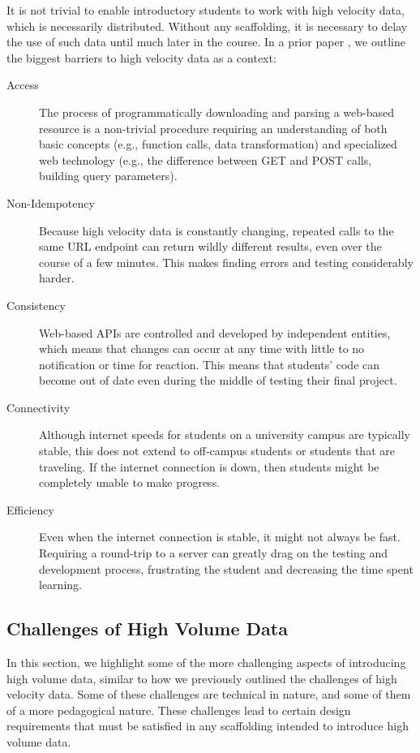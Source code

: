 It is not trivial to enable introductory students to work with high velocity data, which is necessarily distributed. Without any scaffolding, it is necessary to delay the use of such data until much later in the course. In a prior paper \cite{realtimeweb-splashe}, we outline the biggest barriers to high velocity data as a context:
\begin{description}
  \item[Access] The process of programmatically downloading and parsing a web-based resource is a non-trivial procedure requiring an understanding of both basic concepts (e.g., function calls, data transformation) and specialized web technology (e.g., the difference between GET and POST calls, building query parameters).
	\item[Non-Idempotency] Because high velocity data is constantly changing, repeated calls to the same URL endpoint can return wildly different results, even over the course of a few minutes. This makes finding errors and testing considerably harder.
	\item[Consistency] Web-based APIs are controlled and developed by independent entities, which means that changes can occur at any time with little to no notification or time for reaction. This means that students' code can become out of date even during the middle of testing their final project.
	\item[Connectivity] Although internet speeds for students on a university campus are typically stable, this does not extend to off-campus students or students that are traveling. If the internet connection is down, then students might be completely unable to make progress.
	\item[Efficiency] Even when the internet connection is stable, it might not always be fast. Requiring a round-trip to a server can greatly drag on the testing and development process, frustrating the student and decreasing the time spent learning.
\end{description}

\subsection{Challenges of High Volume Data}

In this section, we highlight some of the more challenging aspects of introducing high volume data, similar to how we previously outlined the challenges of high velocity data.
Some of these challenges are technical in nature, and some of them of a more pedagogical nature.
These challenges lead to certain design requirements that must be satisfied in any scaffolding intended to introduce high volume data.

